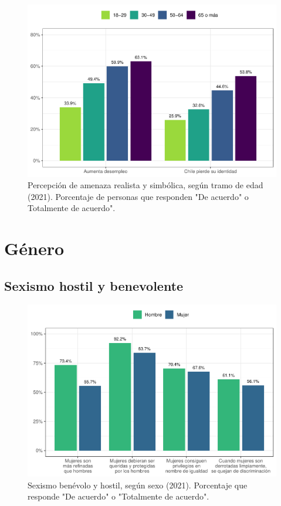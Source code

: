 \documentclass[
  12pt,
]{book}
\begin{document}
\begin{figure}

{\centering \includegraphics{reporte-elsoc_files/figure-latex/amen-edad-1} 

}

\caption{Percepción de amenaza realista y simbólica, según tramo de edad (2021). Porcentaje de personas que responden "De acuerdo" o Totalmente de acuerdo".}\label{fig:amen-edad}
\end{figure}

\hypertarget{guxe9nero}{%
\section{Género}\label{guxe9nero}}

\hypertarget{sexismo-hostil-y-benevolente}{%
\subsection{Sexismo hostil y benevolente}\label{sexismo-hostil-y-benevolente}}

\begin{figure}

{\centering \includegraphics{reporte-elsoc_files/figure-latex/sexismo-sexo-1} 

}

\caption{Sexismo benévolo y hostil, según sexo (2021). Porcentaje que responde "De acuerdo" o "Totalmente de acuerdo".}\label{fig:sexismo-sexo}
\end{figure}
\end{document}
